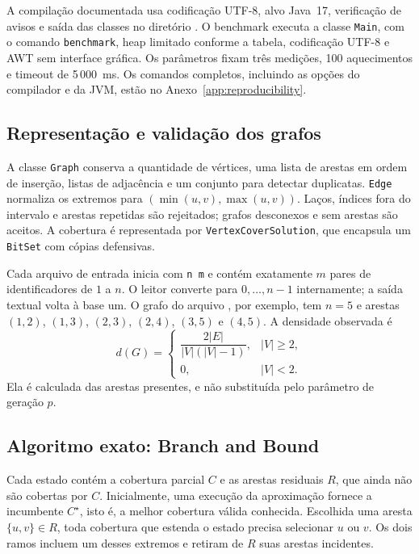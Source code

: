 A compilação documentada usa codificação UTF-8, alvo Java~17,
verificação de avisos e saída das classes no diretório .
O benchmark executa a classe \texttt{Main}, com o comando
\texttt{benchmark}, heap limitado conforme a tabela, codificação
UTF-8 e AWT sem interface gráfica. Os parâmetros fixam três
medições, 100 aquecimentos e timeout de 5\,000~ms.
Os comandos completos, incluindo as opções do compilador
e da JVM, estão no Anexo~\ref{app:reproducibility}.

\subsection{Representação e validação dos grafos}

A classe \texttt{Graph} conserva a quantidade de vértices, uma lista de
arestas em ordem de inserção, listas de adjacência e um conjunto para
detectar duplicatas. \texttt{Edge} normaliza os extremos para
$(\min(u,v),\max(u,v))$. Laços, índices fora do intervalo e arestas
repetidas são rejeitados; grafos desconexos e sem arestas são aceitos.
A cobertura é representada por \texttt{VertexCoverSolution}, que
encapsula um \texttt{BitSet} com cópias defensivas.

Cada arquivo de entrada inicia com \texttt{n m} e contém exatamente
$m$ pares de identificadores de $1$ a $n$. O leitor converte para
$0,\ldots,n-1$ internamente; a saída textual volta à base um.
O grafo do arquivo , por exemplo, tem $n=5$ e
arestas $(1,2)$, $(1,3)$, $(2,3)$, $(2,4)$, $(3,5)$ e $(4,5)$.
A densidade observada é
\begin{equation}
 d(G)=
 \begin{cases}
  \dfrac{2|E|}{|V|(|V|-1)},& |V|\geq 2,\\[4pt]
  0,& |V|<2.
 \end{cases}
 \label{eq:density}
\end{equation}
Ela é calculada das arestas presentes, e não substituída pelo parâmetro
de geração $p$.

\subsection{Algoritmo exato: Branch and Bound}
\label{sec:exact}

Cada estado contém a cobertura parcial $C$ e as arestas residuais $R$,
que ainda não são cobertas por $C$. Inicialmente, uma execução da
aproximação fornece a incumbente $C^\star$, isto é, a melhor cobertura
válida conhecida. Escolhida uma aresta $\{u,v\}\in R$, toda cobertura
que estenda o estado precisa selecionar $u$ ou $v$. Os dois ramos
incluem um desses extremos e retiram de $R$ suas arestas incidentes.

